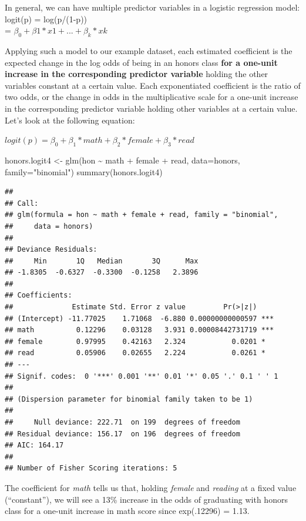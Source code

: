 \documentclass[
]{article}
\newenvironment{Shaded}{\begin{snugshade}}{\end{snugshade}}
\newcommand{\AttributeTok}[1]{\textcolor[rgb]{0.77,0.63,0.00}{#1}}
\newcommand{\FunctionTok}[1]{\textcolor[rgb]{0.00,0.00,0.00}{#1}}
\newcommand{\NormalTok}[1]{#1}
\newcommand{\OtherTok}[1]{\textcolor[rgb]{0.56,0.35,0.01}{#1}}
\newcommand{\SpecialCharTok}[1]{\textcolor[rgb]{0.00,0.00,0.00}{#1}}
\newcommand{\StringTok}[1]{\textcolor[rgb]{0.31,0.60,0.02}{#1}}
\begin{document}
In general, we can have multiple predictor variables in a logistic
regression model: logit(p) = log(p/(1-p))\\
= \(\beta_0 + \beta1 * x1 + ... + \beta_k *xk\)

Applying such a model to our example dataset, each estimated coefficient
is the expected change in the log odds of being in an honors class
\textbf{for a one-unit increase in the corresponding predictor variable}
holding the other variables constant at a certain value. Each
exponentiated coefficient is the ratio of two odds, or the change in
odds in the multiplicative scale for a one-unit increase in the
corresponding predictor variable holding other variables at a certain
value. Let's look at the following equation:

\(logit(p) = \beta_0 + \beta_1 * math + \beta_2 * female + \beta_3 * read\)

\begin{Shaded}
\begin{Highlighting}[]
\NormalTok{honors.logit4 }\OtherTok{\textless{}{-}} \FunctionTok{glm}\NormalTok{(hon }\SpecialCharTok{\textasciitilde{}}\NormalTok{ math }\SpecialCharTok{+}\NormalTok{ female }\SpecialCharTok{+}\NormalTok{ read, }\AttributeTok{data=}\NormalTok{honors, }\AttributeTok{family=}\StringTok{"binomial"}\NormalTok{)}
\FunctionTok{summary}\NormalTok{(honors.logit4)}
\end{Highlighting}
\end{Shaded}

\begin{verbatim}
## 
## Call:
## glm(formula = hon ~ math + female + read, family = "binomial", 
##     data = honors)
## 
## Deviance Residuals: 
##     Min       1Q   Median       3Q      Max  
## -1.8305  -0.6327  -0.3300  -0.1258   2.3896  
## 
## Coefficients:
##              Estimate Std. Error z value         Pr(>|z|)    
## (Intercept) -11.77025    1.71068  -6.880 0.00000000000597 ***
## math          0.12296    0.03128   3.931 0.00008442731719 ***
## female        0.97995    0.42163   2.324           0.0201 *  
## read          0.05906    0.02655   2.224           0.0261 *  
## ---
## Signif. codes:  0 '***' 0.001 '**' 0.01 '*' 0.05 '.' 0.1 ' ' 1
## 
## (Dispersion parameter for binomial family taken to be 1)
## 
##     Null deviance: 222.71  on 199  degrees of freedom
## Residual deviance: 156.17  on 196  degrees of freedom
## AIC: 164.17
## 
## Number of Fisher Scoring iterations: 5
\end{verbatim}

The coefficient for \emph{math} tells us that, holding \emph{female} and
\emph{reading} at a fixed value (``constant''), we will see a 13\%
increase in the odds of graduating with honors class for a one-unit
increase in math score since exp(.12296) = 1.13.
\end{document}
